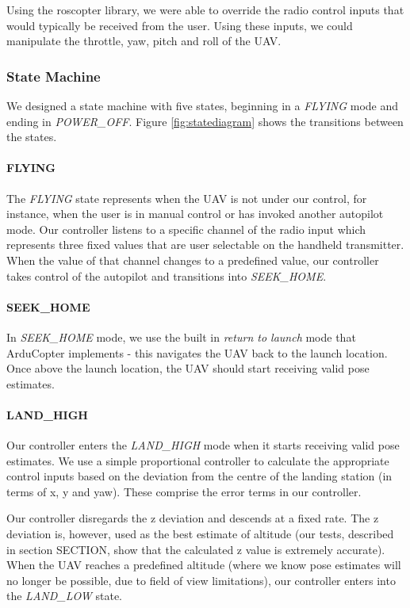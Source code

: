 \documentclass[10pt]{scrartcl} %
\begin{document}
Using the roscopter library, we were able to override the radio control inputs that would typically be received from the user. Using these inputs, we could manipulate the throttle, yaw, pitch and roll of the UAV.

\subsubsection{State Machine}
We designed a state machine with five states, beginning in a \textit{FLYING} mode and ending in \textit{POWER\_OFF}. Figure \ref{fig:statediagram} shows the transitions between the states. 

\paragraph{FLYING}
The \textit{FLYING} state represents when the UAV is not under our control, for instance, when the user is in manual control or has invoked another autopilot mode. Our controller listens to a specific channel of the radio input which represents three fixed values that are user selectable on the handheld transmitter. When the value of that channel changes to a predefined value, our controller takes control of the autopilot and transitions into \textit{SEEK\_HOME}.

\paragraph{SEEK\_HOME}
In \textit{SEEK\_HOME} mode, we use the built in \textit{return to launch} mode that ArduCopter implements - this navigates the UAV back to the launch location. Once above the launch location, the UAV should start receiving valid pose estimates.

\paragraph{LAND\_HIGH}
Our controller enters the \textit{LAND\_HIGH} mode when it starts receiving valid pose estimates. We use a simple proportional controller to calculate the appropriate control inputs based on the deviation from the centre of the landing station (in terms of x, y and yaw). These comprise the error terms in our controller.

Our controller disregards the z deviation and descends at a fixed rate. The z deviation is, however, used as the best estimate of altitude (our tests, described in section SECTION, show that the calculated z value is extremely accurate). When the UAV reaches a predefined altitude (where we know pose estimates will no longer be possible, due to field of view limitations), our controller enters into the \textit{LAND\_LOW} state.
\end{document}
